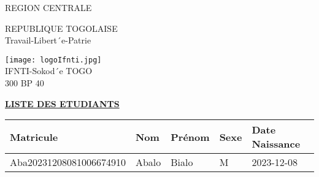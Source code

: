 \documentclass[10pt,a4paper]{article}
\begin{document}
\begin{minipage}{12cm}
	\textsf{REGION CENTRALE} \\ \hspace{1cm}
\end{minipage}
\begin{minipage}{5cm}
	REPUBLIQUE TOGOLAISE\\
	Travail-Libert´e-Patrie
\end{minipage}
\begin{minipage}{3cm}
	\begin{center}
		 \texttt{[image: logoIfnti.jpg]} \\ \hspace{1cm}
		IFNTI-Sokod´e TOGO\\300 BP 40
	\end{center}
\end{minipage}
\begin{center}
	\underline{\textbf{LISTE DES ETUDIANTS}}
\end{center}
\begin{longtable}{|l|l|l|l|l|} \hline
	\textbf{Matricule}  & \textbf{Nom}            & \textbf{Prénom} &
	\textbf{Sexe}       & \textbf{Date Naissance}                      \\ \hline
	
	Aba20231208081006674910 & Abalo           & Bialo &
	M      & 2023-12-08                           \\ \hline
	
\end{longtable}
\end{document}
